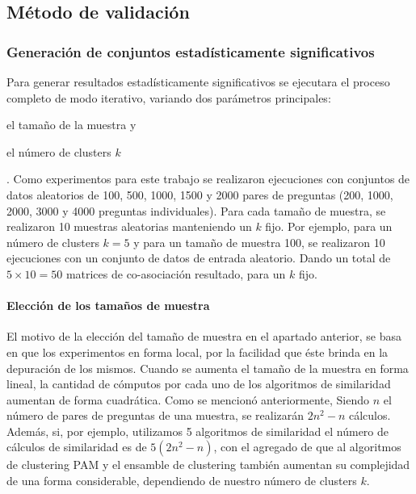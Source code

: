 \subsection{Método de validación}

\subsubsection{Generación de conjuntos estadísticamente significativos}

Para generar resultados estadísticamente significativos se ejecutara el proceso completo de modo iterativo, variando dos parámetros principales: \begin{enumerate*} [label=(\roman*)] \item el tamaño de la muestra y \item el número de clusters \(k\)\end{enumerate*}. Como experimentos para este trabajo se realizaron ejecuciones con conjuntos de datos aleatorios de 100, 500, 1000, 1500 y 2000 pares de preguntas (200, 1000, 2000, 3000 y 4000 preguntas individuales). Para cada tamaño de muestra, se realizaron 10 muestras aleatorias manteniendo un \(k\) fijo. Por ejemplo, para un número de clusters \(k = 5\) y para un tamaño de muestra 100, se realizaron 10 ejecuciones con un conjunto de datos de entrada aleatorio. Dando un total de \(5 \times 10 = 50\) matrices de co-asociación resultado, para un \(k\) fijo.

\paragraph{Elección de los tamaños de muestra}
El motivo de la elección del tamaño de muestra en el apartado anterior, se basa en que los experimentos en forma local, por la facilidad que éste brinda en la depuración de los mismos. Cuando se aumenta el tamaño de la muestra en forma lineal, la cantidad de cómputos por cada uno de los algoritmos de similaridad aumentan de forma cuadrática. Como se mencionó anteriormente, Siendo \(n\) el número de pares de preguntas de una muestra, se realizarán \(2n^2-n\) cálculos. Además, si, por ejemplo, utilizamos 5 algoritmos de similaridad el número de cálculos de similaridad es de \(5(2n^2-n)\), con el agregado de que al algoritmos de clustering PAM y el ensamble de clustering también aumentan su complejidad de una forma considerable, dependiendo de nuestro número de clusters \(k\).

